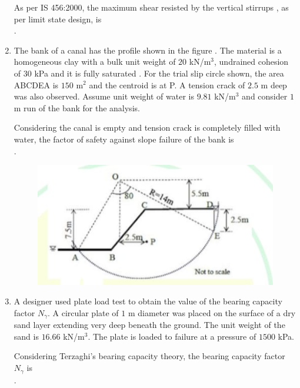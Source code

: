 \documentclass[journal,12pt,onecolumn]{article}
\theoremstyle{remark}
\begin{document}
\begin{enumerate}
    As per IS 456:2000, the maximum shear resisted by the vertical stirrups , as per limit state design, is \underline{\hspace{2cm}} \\ .
    
    \hfill{}

    \item The bank of a canal has the profile shown in the figure . The material is a homogeneous clay with a bulk unit weight of $20$ kN/m$^3$, undrained cohesion of $30$ kPa and it is fully saturated . For the trial slip circle shown, the area ABCDEA is $150$ m$^2$ and the centroid is at P. A tension crack  of $2.5$ m deep was also observed. Assume unit weight of water is $9.81$ kN/m$^3$ and consider $1$ m run of the bank for the analysis.
    
    Considering the canal is empty and tension crack is completely filled with water, the factor of safety against slope failure of the bank is \underline{\hspace{2cm}} \\ .
    \begin{figure}[H]
        \centering
        \includegraphics[width=0.7\columnwidth]{figs/2q-55.jpg}
        \caption{}
        \label{fig:q55}
    \end{figure}
    
    \hfill{}
    
    \item A designer used plate load test to obtain the value of the bearing capacity factor $N_\gamma$. A circular plate of $1$ m diameter was placed on the surface of a dry sand layer extending very deep beneath the ground. The unit weight of the sand is $16.66$ kN/m$^3$. The plate is loaded to failure at a pressure of $1500$ kPa.
    
    Considering Terzaghi's bearing capacity theory, the bearing capacity factor $N_\gamma$ is \underline{\hspace{2cm}} \\ .
    

\end{enumerate}
\end{document}
